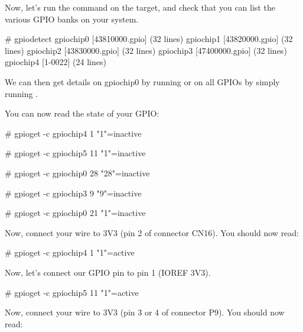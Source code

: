 Now, let's run the  command on the target, and check that
you can list the various GPIO banks on your system.

\begin{bashinput}
# gpiodetect
gpiochip0 [43810000.gpio] (32 lines)
gpiochip1 [43820000.gpio] (32 lines)
gpiochip2 [43830000.gpio] (32 lines)
gpiochip3 [47400000.gpio] (32 lines)
gpiochip4 [1-0022] (24 lines)
\end{bashinput}

We can then get details on gpiochip0 by running
 or on all GPIOs by simply running
.
\fi

You can now read the state of your GPIO:

\if{}
\begin{bashinput}
# gpioget -c gpiochip4 1
"1"=inactive
\end{bashinput}
\fi

\if{}
\begin{bashinput}
# gpioget -c gpiochip5 11
"1"=inactive
\end{bashinput}
\fi

\if{}
\begin{bashinput}
# gpioget -c gpiochip0 28
"28"=inactive
\end{bashinput}
\fi

\if{}
\begin{bashinput}
# gpioget -c gpiochip3 9
"9"=inactive
\end{bashinput}
\fi

\if{}
\begin{bashinput}
# gpioget -c gpiochip0 21
"1"=inactive
\end{bashinput}
\fi

\if{}
Now, connect your wire to 3V3 (pin 2 of connector CN16). You should now
read:

\begin{bashinput}
# gpioget -c gpiochip4 1
"1"=active
\end{bashinput}
\fi

\if{}
Now, let's connect our GPIO pin to pin 1 (IOREF 3V3).

\begin{bashinput}
# gpioget -c gpiochip5 11
"1"=active
\end{bashinput}
\fi

\if{}
Now, connect your wire to 3V3 (pin 3 or 4 of connector P9). You should now
read:

